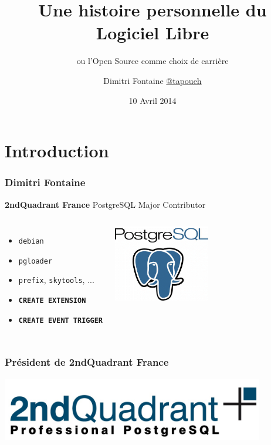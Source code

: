 \documentclass{beamer}
\title{Une histoire personnelle du Logiciel Libre}
\subtitle{ou l'Open Source comme choix de carrière}
\author{Dimitri Fontaine \linebreak \url{@tapoueh}}
\date{10 Avril 2014}
\begin{document}
\frame{\titlepage}

\section{Introduction}

\begin{frame}[fragile]
  \frametitle{Dimitri Fontaine}

  \begin{center}
    \textbf{2ndQuadrant France}
    \linebreak
    PostgreSQL Major Contributor
  \end{center}
  \vfill

\begin{columns}[c]

  \begin{itemize}
   \item \texttt{debian}
   \item \texttt{pgloader}
   \item \texttt{prefix}, \texttt{skytools}, ...
   \item \texttt{\textbf{CREATE EXTENSION}}
   \item \texttt{\textbf{CREATE EVENT TRIGGER}}
  \end{itemize}  

\begin{center}
  \includegraphics[height=9em]{postgres-logo.png}
\end{center}
\end{columns}
\end{frame}

\begin{frame}
  \frametitle{Président de 2ndQuadrant France}

  \begin{center}
    \includegraphics[height=1.1in]{2ndquadrant_logo_full_color.jpg}
  \end{center}

  \vfill
\end{frame}
\end{document}
